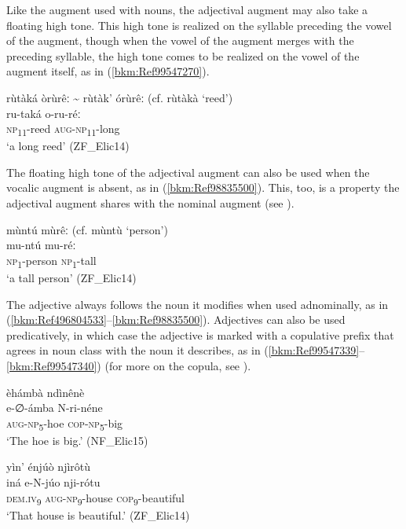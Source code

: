 Like the augment used with nouns, the adjectival augment may also take a floating high tone. This high tone is realized on the syllable preceding the vowel of the augment, though when the vowel of the augment merges with the preceding syllable, the high tone comes to be realized on the vowel of the augment itself, as in (\ref{bkm:Ref99547270}).

\ea
\label{bkm:Ref99547270}
rùtàká òrùrêː {\textasciitilde} rùtàk’ órùrêː (cf. rùtàkà ‘reed’)\\
\gll ru-taká  o-ru-réː\\
\textsc{np}\textsubscript{11}-reed  \textsc{aug}-\textsc{np}\textsubscript{11}-long\\
\glt ‘a long reed’ (ZF\_Elic14)
\z

The floating high tone of the adjectival augment can also be used when the vocalic augment is absent, as in (\ref{bkm:Ref98835500}). This, too, is a property the adjectival augment shares with the nominal augment (see ).

\ea
\label{bkm:Ref98835500}
mùntú mùrêː (cf. mùntù ‘person’)\\
\gll mu-ntú  mu-réː\\
\textsc{np}\textsubscript{1}-person  \textsc{np}\textsubscript{1}-tall\\
\glt ‘a tall person’ (ZF\_Elic14)
\z

The adjective always follows the noun it modifies when used adnominally, as in (\ref{bkm:Ref496804533}--\ref{bkm:Ref98835500}). Adjectives can also be used predicatively, in which case the adjective is marked with a copulative prefix that agrees in noun class with the noun it describes, as in (\ref{bkm:Ref99547339}--\ref{bkm:Ref99547340}) (for more on the copula, see ).

\ea
\label{bkm:Ref99547339}
èhámbà ndìnênè\\
\gll e-∅-ámba    N-ri-néne\\
\textsc{aug}-\textsc{np}\textsubscript{5}-hoe    \textsc{cop}-\textsc{np}\textsubscript{5}-big\\
\glt ‘The hoe is big.’ (NF\_Elic15)
\z

\ea
\label{bkm:Ref99547340}
yìn’ énjúò njìrôtù\\
\gll iná    e-N-júo    nji-rótu\\
\textsc{dem}.\textsc{iv}\textsubscript{9}  \textsc{aug}-\textsc{np}\textsubscript{9}-house  \textsc{cop}\textsubscript{9}-beautiful\\
\glt ‘That house is beautiful.’ (ZF\_Elic14)
\z

